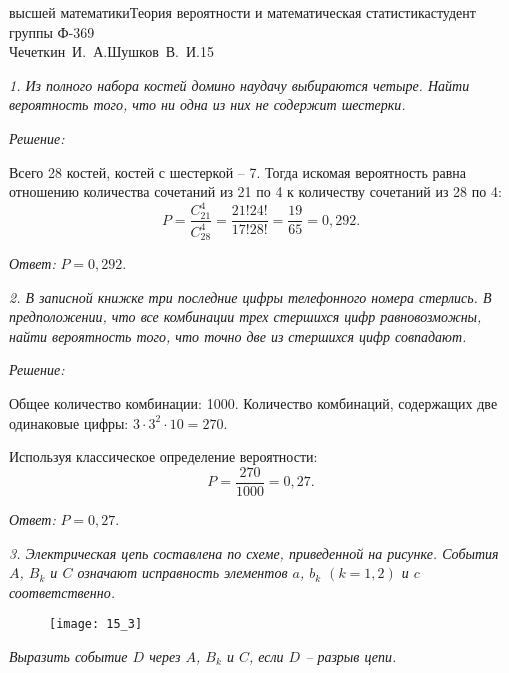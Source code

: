 



\newcommand{\ds}{\displaystyle}


{высшей математики}{Теория вероятности и математическая статистика}{студент
группы Ф-369\\Чечеткин~И.~А.}{Шушков~В.~И.}{\!\!}{15}

\emph{1. Из полного набора костей домино наудачу выбираются четыре. Найти вероятность
того, что ни одна из них не содержит шестерки.}

\vspace*{2em}
\emph{Решение:}

Всего 28 костей, костей с шестеркой -- 7. Тогда искомая вероятность равна
отношению количества сочетаний из 21 по 4 к количеству сочетаний из 28 по 4:
\[
    P = \frac{C_{21}^4}{C_{28}^4} = \frac{21!24!}{17!28!} = \frac{19}{65} = 0,292.
\]

\vspace*{2em}
\emph{Ответ:} \( P = 0,292 \).

\vspace*{2em}

\emph{2. В записной книжке три последние цифры телефонного номера стерлись. В
предположении, что все комбинации трех стершихся цифр равновозможны, найти
вероятность того, что точно две из стершихся цифр совпадают.}

\vspace*{2em}
\emph{Решение:}

Общее количество комбинации: 1000. Количество комбинаций, содержащих две
одинаковые цифры: \( 3\cdot 3^2 \cdot 10 = 270 \).

Используя классическое определение вероятности:
\[
    P = \frac{270}{1000} = 0,27.
\]

\vspace*{2em}
\emph{Ответ:} \( P = 0,27 \).

\pagebreak

\emph{3. Электрическая цепь составлена по схеме, приведенной на рисунке. События
\( A \), \( B_k \) и \( C \) означают исправность элементов \( a \), \( b_k \)
\( (k = 1, 2) \) и \( c \) соответственно.}

\begin{figure}[h!]
    \center
    \texttt{[image: 15\_3]}
\end{figure}

\emph{Выразить событие \( D \) через \( A \), \( B_k \) и \( C \), если \( D \) -- разрыв цепи.}

